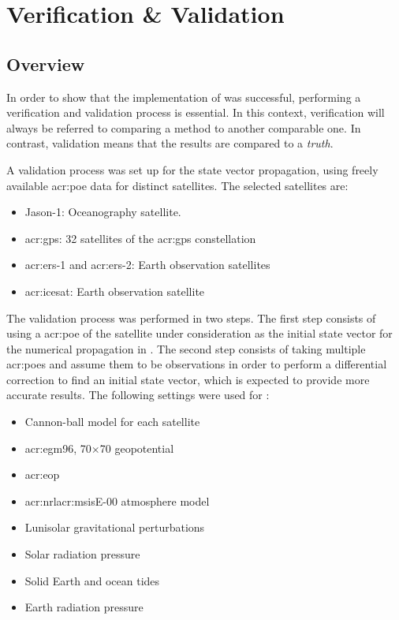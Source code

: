 \chapter{Verification \& Validation}
\label{cha:validation}

\section{Overview}

In order to show that the implementation of \neptune{} was successful, performing a verification and validation process is essential. In this context, 
verification will always be referred to comparing a method to another comparable one. In contrast, validation means that the results are compared to a \textit{truth}.

A validation process was set up for the state vector propagation, using freely available \gls{acr:poe} data for distinct satellites. The selected satellites 
are:
\begin{itemize}
 \item Jason-1: Oceanography satellite. 
 \item \acrshort{acr:gps}: 32 satellites of the \gls{acr:gps} constellation
 \item \acrshort{acr:ers}-1 and \acrshort{acr:ers}-2: Earth observation satellites
 \item \acrshort{acr:icesat}: Earth observation satellite
\end{itemize}

The validation process was performed in two steps. The first step consists of using a \gls{acr:poe} of the satellite under consideration as the initial state 
vector for the numerical propagation in \neptune{}. The second step consists of taking multiple \gls{acr:poe}s and assume them to be observations in order to 
perform a differential correction to find an initial state vector, which is expected to provide more accurate results. The following settings were used for 
\neptune{}:
\begin{itemize}
 \item Cannon-ball model for each satellite
 \item \acrshort{acr:egm}96, \num{70}$\times$\num{70} geopotential
 \item \gls{acr:eop}
 \item \acrshort{acr:nrl}\acrshort{acr:msis}E-00 atmosphere model
 \item Lunisolar gravitational perturbations
 \item Solar radiation pressure
 \item Solid Earth and ocean tides
 \item Earth radiation pressure
\end{itemize}

